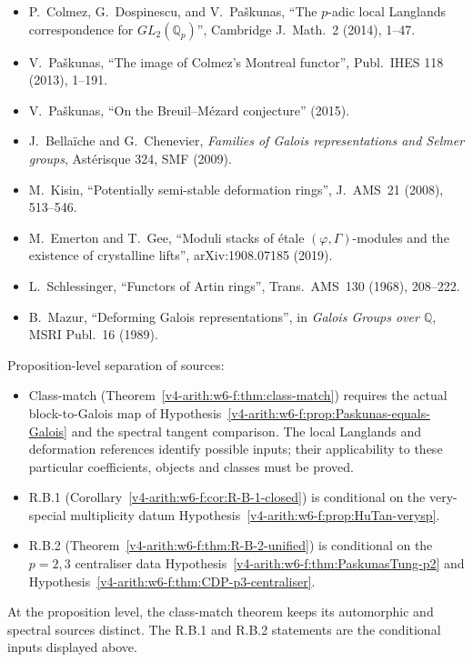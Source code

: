 \begin{itemize}
\item P.~Colmez, G.~Dospinescu, and V.~Pa\v skunas, ``The \(p\)-adic
local Langlands correspondence for \(GL_{2}(\mathbb{Q}_{p})\)'',
Cambridge J.~Math.~2 (2014), 1--47.
\item V.~Pa\v skunas, ``The image of Colmez's Montreal functor'',
Publ.~IHES 118 (2013), 1--191.
\item V.~Pa\v skunas, ``On the Breuil--M\'ezard conjecture'' (2015).
\item J.~Bella\"iche and G.~Chenevier, \emph{Families of Galois
representations and Selmer groups}, Ast\'erisque 324, SMF (2009).
\item M.~Kisin, ``Potentially semi-stable deformation rings'',
J.~AMS~21 (2008), 513--546.
\item M.~Emerton and T.~Gee, ``Moduli stacks of \'etale
\((\varphi,\Gamma)\)-modules and the existence of crystalline lifts'',
arXiv:1908.07185 (2019).
\item L.~Schlessinger, ``Functors of Artin rings'', Trans.~AMS~130
(1968), 208--222.
\item B.~Mazur, ``Deforming Galois representations'', in
\emph{Galois Groups over \(\mathbb{Q}\)}, MSRI Publ.~16 (1989).
\end{itemize}

Proposition-level separation of sources:
\begin{itemize}
\item Class-match (Theorem~\ref{v4-arith:w6-f:thm:class-match})
requires the actual block-to-Galois map of
Hypothesis~\ref{v4-arith:w6-f:prop:Paskunas-equals-Galois} and the
spectral tangent comparison. The local Langlands and deformation
references identify possible inputs; their applicability to these
particular coefficients, objects and classes must be proved.
\item R.B.1 (Corollary~\ref{v4-arith:w6-f:cor:R-B-1-closed}) is conditional on
the very-special multiplicity datum
Hypothesis~\ref{v4-arith:w6-f:prop:HuTan-verysp}.
\item R.B.2 (Theorem~\ref{v4-arith:w6-f:thm:R-B-2-unified}) is conditional on
the \(p=2,3\) centraliser data
Hypothesis~\ref{v4-arith:w6-f:thm:PaskunasTung-p2} and
Hypothesis~\ref{v4-arith:w6-f:thm:CDP-p3-centraliser}.
\end{itemize}
At the proposition level, the class-match theorem keeps its automorphic
and spectral sources distinct. The R.B.1 and R.B.2 statements are the
conditional inputs displayed above.

